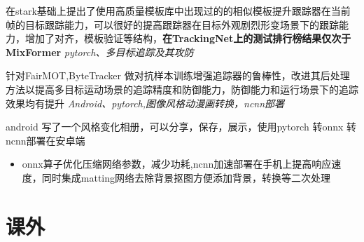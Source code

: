 \documentclass{uniquecv}
\begin{document}
在stark基础上提出了使用高质量模板库中出现过的的相似模板提升跟踪器在当前帧的目标跟踪能力，可以很好的提高跟踪器在目标外观剧烈形变场景下的跟踪能力，增加了对齐，模板验证等结构，\textbf{在TrackingNet上的测试排行榜结果仅次于MixFormer}
\textit{pytorch、多目标追踪及其攻防}
\vspace{0.4ex}

针对FairMOT,ByteTracker 做对抗样本训练增强追踪器的鲁棒性，改进其后处理方法以提高多目标运动场景的追踪精度和防御能力，防御能力和运行场景下的追踪效果均有提升
\textit{Android、pytorch,图像风格动漫画转换，ncnn部署}
\vspace{0.4ex}

android 写了一个风格变化相册，可以分享，保存，展示，使用pytorch 转onnx 转 ncnn部署在安卓端
\begin{itemize}
  \item onnx算子优化压缩网络参数，减少功耗,ncnn加速部署在手机上提高响应速度，同时集成matting网络去除背景抠图方便添加背景，转换等二次处理
\end{itemize}
\section{课外}
\end{document}
